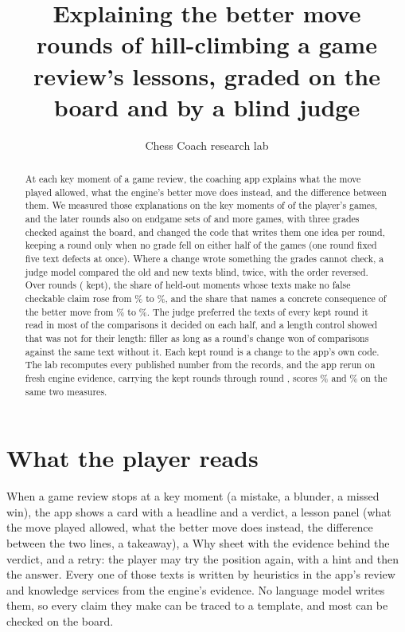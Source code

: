 \documentclass[11pt]{article}
\title{Explaining the better move\\[0.3em]
\large \RoundCountCap{} rounds of hill-climbing a game review's lessons, graded on the board and by a blind judge}
\author{Chess Coach research lab}
\date{}
\begin{document}
\maketitle

\begin{abstract}
At each key moment of a game review, the coaching app explains what the move played allowed,
what the engine's better move does instead, and the difference between them. We measured
those explanations on the \Moments{} key moments of \Games{} of the player's games, and the
later rounds also on endgame sets of \EndgameGames{} and \EndgameTwoGames{} more games, with three
grades checked against the board, and changed the code that writes them one idea per round,
keeping a round only when no grade fell on either half of the games (one round fixed five
text defects at once). Where a change wrote
something the grades cannot check, a judge model compared the old and new texts blind, twice,
with the order reversed. Over \RoundCount{} rounds (\KeptRoundCount{} kept), the share of held-out moments whose
texts make no false checkable claim rose from \BaseTestFaithful\% to \KeptTestFaithful\%, and
the share that names a concrete consequence of the better move from \BaseTestConcrete\% to
\KeptTestConcrete\%. The judge preferred the texts of every kept round it read in most of the
comparisons it decided on each half, and a length control showed that was not for their length: filler as long as a
round's change won \LengthPaddingDecoy{} of \LengthPaddingN{} comparisons against the same text
without it. Each kept round is a change to the app's own code. The lab recomputes every
published number from the records, and the app rerun on fresh engine evidence, carrying the kept
rounds through round \AppKeptThrough, scores \RerunTestFaithful\% and \RerunTestConcrete\% on
the same two measures.
\end{abstract}

\section{What the player reads}

When a game review stops at a key moment (a mistake, a blunder, a missed win), the app shows a
card with a headline and a verdict, a lesson panel (what the move played allowed, what the
better move does instead, the difference between the two lines, a takeaway), a Why sheet with
the evidence behind the verdict, and a retry: the player may try the position again, with a
hint and then the answer. Every one of those texts is written by heuristics in the app's review
and knowledge services from the engine's evidence. No language model writes them, so every
claim they make can be traced to a template, and most can be checked on the board.
\end{document}
